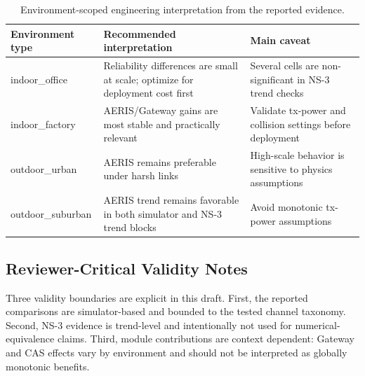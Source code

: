 \documentclass[sensors,article,submit,moreauthors,pdftex]{Definitions/mdpi}
\begin{document}
\begin{table}[H]
\caption{Environment-scoped engineering interpretation from the reported evidence.}
\label{tab:deployment_summary}
\centering
\small
\begin{tabular}{p{} p{} p{}}
\toprule
Environment type & Recommended interpretation & Main caveat \\
\midrule
indoor\_office & Reliability differences are small at scale; optimize for deployment cost first & Several cells are non-significant in NS-3 trend checks \\
indoor\_factory & AERIS/Gateway gains are most stable and practically relevant & Validate tx-power and collision settings before deployment \\
outdoor\_urban & AERIS remains preferable under harsh links & High-scale behavior is sensitive to physics assumptions \\
outdoor\_suburban & AERIS trend remains favorable in both simulator and NS-3 trend blocks & Avoid monotonic tx-power assumptions \\
\bottomrule
\end{tabular}
\normalsize
\end{table}

\subsection*{Reviewer-Critical Validity Notes}
Three validity boundaries are explicit in this draft. First, the reported comparisons are simulator-based and bounded to the tested channel taxonomy. Second, NS-3 evidence is trend-level and intentionally not used for numerical-equivalence claims. Third, module contributions are context dependent: Gateway and CAS effects vary by environment and should not be interpreted as globally monotonic benefits.
\end{document}
